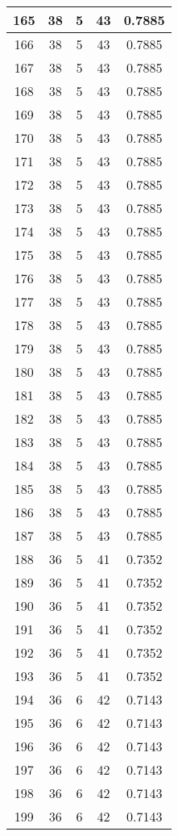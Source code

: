 \documentclass[letterpaper, 12pt]{article}
\begin{document}
\begin{longtable}{|c|c|c|c|c|}
\hline
165 & 38 & 5 & 43 & 0.7885 \\
\hline
166 & 38 & 5 & 43 & 0.7885 \\
\hline
167 & 38 & 5 & 43 & 0.7885 \\
\hline
168 & 38 & 5 & 43 & 0.7885 \\
\hline
169 & 38 & 5 & 43 & 0.7885 \\
\hline
170 & 38 & 5 & 43 & 0.7885 \\
\hline
171 & 38 & 5 & 43 & 0.7885 \\
\hline
172 & 38 & 5 & 43 & 0.7885 \\
\hline
173 & 38 & 5 & 43 & 0.7885 \\
\hline
174 & 38 & 5 & 43 & 0.7885 \\
\hline
175 & 38 & 5 & 43 & 0.7885 \\
\hline
176 & 38 & 5 & 43 & 0.7885 \\
\hline
177 & 38 & 5 & 43 & 0.7885 \\
\hline
178 & 38 & 5 & 43 & 0.7885 \\
\hline
179 & 38 & 5 & 43 & 0.7885 \\
\hline
180 & 38 & 5 & 43 & 0.7885 \\
\hline
181 & 38 & 5 & 43 & 0.7885 \\
\hline
182 & 38 & 5 & 43 & 0.7885 \\
\hline
183 & 38 & 5 & 43 & 0.7885 \\
\hline
184 & 38 & 5 & 43 & 0.7885 \\
\hline
185 & 38 & 5 & 43 & 0.7885 \\
\hline
186 & 38 & 5 & 43 & 0.7885 \\
\hline
187 & 38 & 5 & 43 & 0.7885 \\
\hline
188 & 36 & 5 & 41 & 0.7352 \\
\hline
189 & 36 & 5 & 41 & 0.7352 \\
\hline
190 & 36 & 5 & 41 & 0.7352 \\
\hline
191 & 36 & 5 & 41 & 0.7352 \\
\hline
192 & 36 & 5 & 41 & 0.7352 \\
\hline
193 & 36 & 5 & 41 & 0.7352 \\
\hline
194 & 36 & 6 & 42 & 0.7143 \\
\hline
195 & 36 & 6 & 42 & 0.7143 \\
\hline
196 & 36 & 6 & 42 & 0.7143 \\
\hline
197 & 36 & 6 & 42 & 0.7143 \\
\hline
198 & 36 & 6 & 42 & 0.7143 \\
\hline
199 & 36 & 6 & 42 & 0.7143 \\
\hline
\end{longtable}
\end{document}
